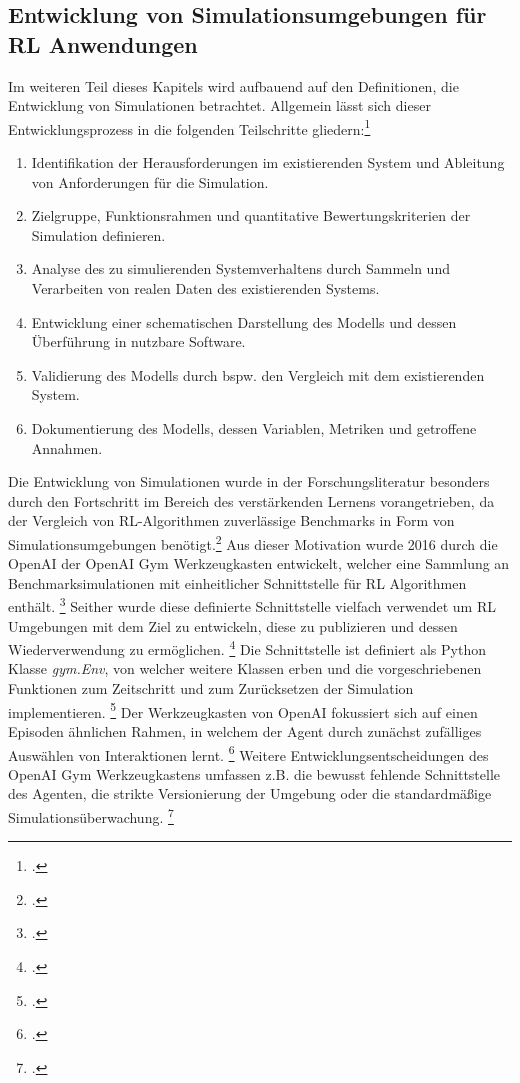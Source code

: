 \subsection{Entwicklung von Simulationsumgebungen für RL Anwendungen}
Im weiteren Teil dieses Kapitels wird aufbauend auf den Definitionen, die Entwicklung von Simulationen betrachtet.
Allgemein lässt sich dieser Entwicklungsprozess in die folgenden Teilschritte gliedern:\footcite[Vgl.][S. 8f.]{Maria.1997}
\begin{enumerate}
    \item Identifikation der Herausforderungen im existierenden System und Ableitung von Anforderungen für die Simulation.
    \item Zielgruppe, Funktionsrahmen und quantitative Bewertungskriterien der Simulation definieren.
    \item Analyse des zu simulierenden Systemverhaltens durch Sammeln und Verarbeiten von realen Daten des existierenden Systems.
    \item Entwicklung einer schematischen Darstellung des Modells und dessen Überführung in nutzbare Software.
    \item Validierung des Modells durch bspw. den Vergleich mit dem existierenden System.
    \item Dokumentierung des Modells, dessen Variablen, Metriken und getroffene Annahmen.
\end{enumerate}

Die Entwicklung von Simulationen wurde in der Forschungsliteratur besonders durch den Fortschritt im Bereich des verstärkenden Lernens vorangetrieben, da der Vergleich von RL-Algorithmen zuverlässige Benchmarks in Form von Simulationsumgebungen benötigt.\footcite[Vgl.][S. 1]{Brockman.2016}
Aus dieser Motivation wurde 2016 durch die OpenAI der OpenAI Gym Werkzeugkasten entwickelt, welcher eine Sammlung an Benchmarksimulationen mit einheitlicher Schnittstelle für RL Algorithmen enthält. \footcite[Vgl.][S. 1]{Brockman.2016}
Seither wurde diese definierte Schnittstelle vielfach verwendet um RL Umgebungen mit dem Ziel zu entwickeln, diese zu publizieren und dessen Wiederverwendung zu ermöglichen. \footcite[Vgl.][S. 4]{Schuderer.2021}
Die Schnittstelle ist definiert als Python Klasse \textit{gym.Env}, von welcher weitere Klassen erben und die vorgeschriebenen Funktionen zum Zeitschritt und zum Zurücksetzen der Simulation implementieren. \footcite[Vgl.][S. 4]{Schuderer.2021}
Der Werkzeugkasten von OpenAI fokussiert sich auf einen Episoden ähnlichen Rahmen, in welchem der Agent durch zunächst zufälliges Auswählen von Interaktionen lernt. \footcite[Vgl.][S. 1]{Brockman.2016}
Weitere Entwicklungsentscheidungen des OpenAI Gym Werkzeugkastens umfassen z.B. die bewusst fehlende Schnittstelle des Agenten, die strikte Versionierung der Umgebung oder die standardmäßige Simulationsüberwachung. \footcite[Vgl.][S. 2f.]{Brockman.2016}

